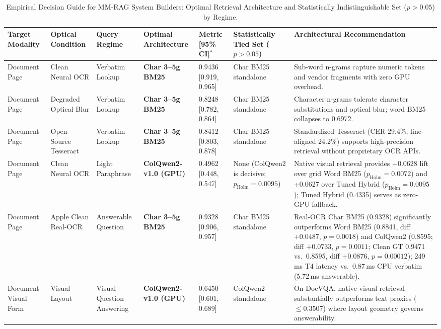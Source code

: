 \begin{table}[t]
\centering\footnotesize
\setlength{\tabcolsep}{2.5pt}
\caption{Empirical Decision Guide for MM-RAG System Builders: Optimal Retrieval Architecture and Statistically Indistinguishable Set ($p > 0.05$) by Regime.}\label{tab:decision_guide_v6}
\begin{tabular}{@{}p{1.6cm}p{1.8cm}p{1.8cm}p{2.1cm}p{1.8cm}p{2.3cm}p{4.1cm}@{}}
\toprule
\textbf{Target Modality} & \textbf{Optical Condition} & \textbf{Query Regime} & \textbf{Optimal Architecture} & \textbf{Metric [95\% CI]}$^*$ & \makecell[c]{\textbf{Statistically}\\\textbf{Tied Set}\\\scriptsize($p > 0.05$)} & \textbf{Architectural Recommendation} \\
\midrule
Document Page & Clean Neural OCR & Verbatim Lookup & \textbf{Char 3--5g BM25} & 0.9436 [0.919, 0.965] & Char BM25 standalone & Sub-word n-grams capture numeric tokens and vendor fragments with zero GPU overhead. \\
Document Page & Degraded Optical Blur & Verbatim Lookup & \textbf{Char 3--5g BM25} & 0.8248 [0.782, 0.864] & Char BM25 standalone & Character n-grams tolerate character substitutions and optical blur; word BM25 collapses to 0.6972. \\
Document Page & Open-Source Tesseract & Verbatim Lookup & \textbf{Char 3--5g BM25} & 0.8412 [0.803, 0.878] & Char BM25 standalone & Standardized Tesseract (CER 29.4\%, line-aligned 24.2\%) supports high-precision retrieval without proprietary OCR APIs. \\
Document Page & Clean Neural OCR & Light Paraphrase & \textbf{ColQwen2-v1.0 (GPU)} & 0.4962 [0.448, 0.547] & None (ColQwen2 is decisive; $p_{\text{Holm}} = 0.0095$) & Native visual retrieval provides +0.0628 lift over grid Word BM25 ($p_{\text{Holm}} = 0.0072$) and +0.0627 over Tuned Hybrid ($p_{\text{Holm}} = 0.0095$); Tuned Hybrid (0.4335) serves as zero-GPU fallback. \\
Document Page & Apple Clean Real-OCR & Answerable Question & \textbf{Char 3--5g BM25} & 0.9328 [0.906, 0.957] & Char BM25 standalone & Real-OCR Char BM25 (0.9328) significantly outperforms Word BM25 (0.8841, diff $+0.0487$, $p=0.0018$) and ColQwen2 (0.8595; diff $+0.0733$, $p = 0.0011$; Clean GT 0.9471 vs.\ 0.8595, diff $+0.0876$, $p=0.00012$); 249\,ms T4 latency vs.\ 0.87\,ms CPU verbatim (5.72\,ms answerable). \\
Document Visual Form & Visual Layout & Visual Question Answering & \textbf{ColQwen2-v1.0 (GPU)} & 0.6450 [0.601, 0.689] & ColQwen2 standalone & On DocVQA, native visual retrieval substantially outperforms text proxies ($\le 0.3507$) where layout geometry governs answerability. \\

\end{tabular}
\end{table}
